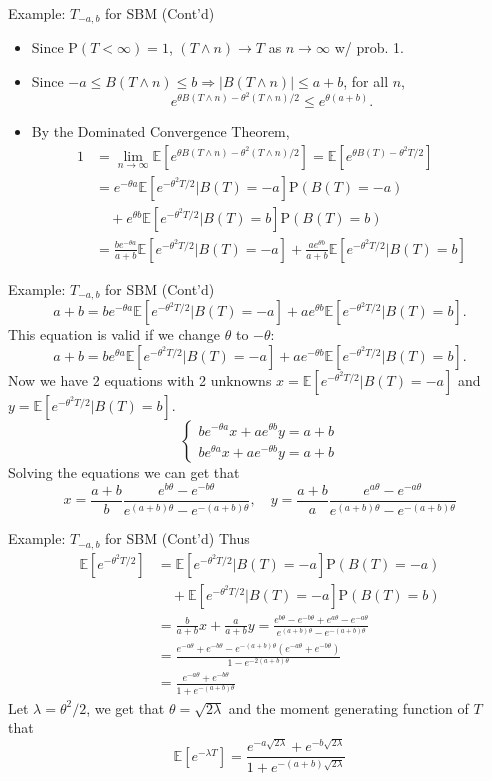 \documentclass[letterpaper,handout]{beamer}
\def\p{\mathrm P}
\def\E{\mathbb E}
\begin{document}
\begin{frame}{Example: $T_{-a,b}$ for SBM (Cont'd)}
\begin{itemize}
\item Since $\p(T<\infty)=1$, $(T\wedge n)\to T$ as $n\to\infty$ w/ prob. 1.
\item Since $-a\le B(T\wedge n)\le b\Rightarrow |B(T\wedge n)|\le a+b$, for all $n$, $$e^{\theta B(T\wedge n)-\theta^2(T\wedge n)/2}\le e^{\theta (a+b)}.$$
\item By the Dominated Convergence Theorem,
\begin{align*}
1&=\lim_{n\to\infty}\E[e^{\theta B(T\wedge n)-\theta^2(T\wedge n)/2}]=\E[e^{\theta B(T)-\theta^2T/2}]\\
&=e^{-\theta a}\E[e^{-\theta^2T/2}|B(T)=-a]\p(B(T)=-a)\\
&\quad+e^{ \theta b}\E[e^{-\theta^2T/2}|B(T)=b]\p(B(T)=b)\\
&=\frac{be^{-\theta a}}{a+b}\E[e^{-\theta^2T/2}|B(T)=-a]+\frac{ae^{\theta b}}{a+b}\E[e^{-\theta^2T/2}|B(T)=b]
\end{align*}
\end{itemize}
\end{frame}
\begin{frame}{Example: $T_{-a,b}$ for SBM (Cont'd)}
$$a+b=be^{-\theta a}\E[e^{-\theta^2T/2}|B(T)=-a]+ae^{\theta b}\E[e^{-\theta^2T/2}|B(T)=b].$$
This equation is valid if we change $\theta$ to $-\theta$:
$$a+b=be^{\theta a}\E[e^{-\theta^2T/2}|B(T)=-a]+ae^{-\theta b}\E[e^{-\theta^2T/2}|B(T)=b].$$
Now we have 2 equations with 2 unknowns $x=\E[e^{-\theta^2T/2}|B(T)=-a]$ and $y=\E[e^{-\theta^2T/2}|B(T)=b]$.
$$
\begin{cases}
be^{-\theta a}x+ae^{\theta b}y=a+b\\
be^{\theta a}x+ae^{-\theta b}y=a+b
\end{cases}
$$
Solving the equations we can get that
$$
x=\frac{a+b}{b}\frac{e^{b\theta}-e^{-b\theta}}{e^{(a+b)\theta}-e^{-(a+b)\theta}},\quad
y=\frac{a+b}{a}\frac{e^{a\theta}-e^{-a\theta}}{e^{(a+b)\theta}-e^{-(a+b)\theta}}
$$
\end{frame}
\begin{frame}{Example: $T_{-a,b}$ for SBM (Cont'd)}
Thus
\begin{align*}
\E[e^{-\theta^2T/2}]&=\E[e^{-\theta^2T/2}|B(T)=-a]\p(B(T)=-a)\\
&\quad+\E[e^{-\theta^2T/2}|B(T)=-a]\p(B(T)=b)\\
&=\frac{b}{a+b}x+\frac{a}{a+b}y=\frac{e^{b\theta}-e^{-b\theta}+e^{a\theta}-e^{-a\theta}}{e^{(a+b)\theta}-e^{-(a+b)\theta}}\\
&=\frac{e^{-a\theta}+e^{-b\theta}-e^{-(a+b)\theta}(e^{-a\theta}+e^{-b\theta})}{1-e^{-2(a+b)\theta}}\\
&=\frac{e^{-a\theta}+e^{-b\theta}}{1+e^{-(a+b)\theta}}
\end{align*}
Let $\lambda = \theta^2/2$, we get that $\theta=\sqrt{2\lambda}$ and the moment generating function of $T$ that
$$
\E[e^{-\lambda T}]=\frac{e^{-a\sqrt{2\lambda}}+e^{-b\sqrt{2\lambda}}}{1+e^{-(a+b)\sqrt{2\lambda}}}$$
\end{frame}
\end{document}
